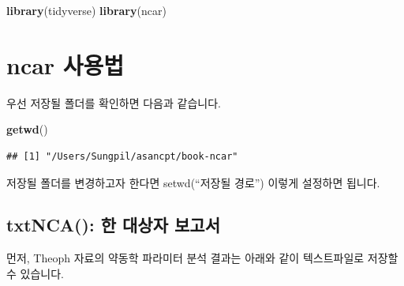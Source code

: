 \documentclass[12pt,]{krantz}
\newenvironment{Shaded}{\begin{snugshade}}{\end{snugshade}}
\newcommand{\KeywordTok}[1]{\textcolor[rgb]{0.13,0.29,0.53}{\textbf{#1}}}
\newcommand{\DataTypeTok}[1]{\textcolor[rgb]{0.13,0.29,0.53}{#1}}
\newcommand{\DecValTok}[1]{\textcolor[rgb]{0.00,0.00,0.81}{#1}}
\newcommand{\StringTok}[1]{\textcolor[rgb]{0.31,0.60,0.02}{#1}}
\newcommand{\OperatorTok}[1]{\textcolor[rgb]{0.81,0.36,0.00}{\textbf{#1}}}
\newcommand{\NormalTok}[1]{#1}
\theoremstyle{definition}
\theoremstyle{definition}
\theoremstyle{definition}
\theoremstyle{remark}
\begin{document}
\begin{Shaded}
\begin{Highlighting}[]
\KeywordTok{library}\NormalTok{(tidyverse)}
\KeywordTok{library}\NormalTok{(ncar)}
\end{Highlighting}
\end{Shaded}

\section{ncar 사용법}\label{ncar-}

우선 저장될 폴더를 확인하면 다음과 같습니다.

\begin{Shaded}
\begin{Highlighting}[]
\KeywordTok{getwd}\NormalTok{()}
\end{Highlighting}
\end{Shaded}

\begin{verbatim}
## [1] "/Users/Sungpil/asancpt/book-ncar"
\end{verbatim}

저장될 폴더를 변경하고자 한다면 setwd(``저장될 경로'') 이렇게 설정하면
됩니다.

\subsection{txtNCA(): 한 대상자 보고서}\label{txtnca---}

\begin{Shaded}
\end{Shaded}

먼저, Theoph 자료의 약동학 파라미터 분석 결과는 아래와 같이 텍스트파일로
저장할 수 있습니다.
\end{document}
